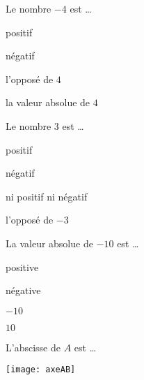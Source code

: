 \begin{QCM}
  \begin{GroupeQCM}
    \begin{exercice}
      Le nombre $-4$ est \ldots
      \begin{ChoixQCM}{4}
      \item positif
      \item négatif
      \item l'opposé de $4$
      \item la valeur absolue de $4$
      \end{ChoixQCM}
\begin{corrige}
   \end{corrige}
    \end{exercice}
    
    
    \begin{exercice}
      Le nombre 3 est \ldots
      \begin{ChoixQCM}{4}
      \item positif
      \item négatif
      \item ni positif ni négatif
      \item l'opposé de $-3$
      \end{ChoixQCM}
\begin{corrige}
   \end{corrige}
    \end{exercice}


    \begin{exercice}
      La valeur absolue de $-10$ est \ldots
      \begin{ChoixQCM}{4}
      \item positive
      \item négative
      \item $-10$
      \item $10$
      \end{ChoixQCM}
\begin{corrige}
   \end{corrige}
    \end{exercice}


    \begin{exercice}
      L'abscisse de $A$ est \ldots 
\vspace{-2em}
\begin{center}  \texttt{[image: axeAB]} \end{center}


\end{exercice}
\end{GroupeQCM}
\end{QCM}
